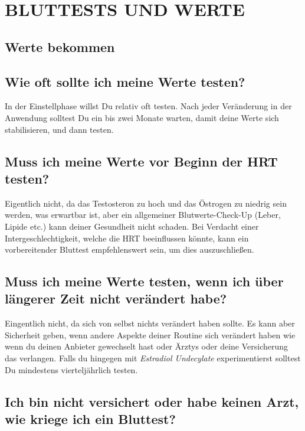 \documentclass{article}
\begin{document}
{ 

\section{BLUTTESTS UND WERTE}

\subsection*{Werte bekommen}

\subsection{Wie oft sollte ich meine Werte testen?}

In der Einstellphase willst Du relativ oft testen. Nach jeder Veränderung in der Anwendung solltest Du ein bis zwei Monate warten, damit deine Werte sich stabilisieren, und dann testen.

\subsection{Muss ich meine Werte vor Beginn der HRT testen?}

Eigentlich nicht, da das Testosteron zu hoch und das Östrogen zu niedrig sein werden, was erwartbar ist, aber ein allgemeiner Blutwerte-Check-Up (Leber, Lipide etc.) kann deiner Gesundheit nicht schaden. Bei Verdacht einer Intergeschlechtigkeit, welche die HRT beeinflussen könnte, kann ein vorbereitender Bluttest empfehlenswert sein, um dies auszuschließen.

\subsection{Muss ich meine Werte testen, wenn ich über längerer Zeit nicht verändert habe?}

Eingentlich nicht, da sich von selbst nichts verändert haben sollte. Es kann aber Sicherheit geben, wenn andere Aspekte deiner Routine sich verändert haben wie wenn du deinen Anbieter gewechselt hast oder Ärztys oder deine Versicherung das verlangen. Falls du hingegen mit \textit{Estradiol Undecylate} experimentierst solltest Du mindestens vierteljährlich testen.

\subsection{Ich bin nicht versichert oder habe keinen Arzt, wie kriege ich ein Bluttest?}

}
\end{document}
